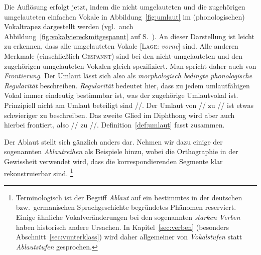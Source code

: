 Die Auflösung erfolgt jetzt, indem die nicht umgelauteten und die zugehörigen umgelauteten einfachen Vokale in Abbildung~\ref{fig:umlaut} im (phonologischen) Vokaltrapez dargestellt werden (vgl.\ auch Abbildung~\ref{fig:vokalviereckmitgespannt} auf S.~\pageref{fig:vokalviereckmitgespannt}).
An dieser Darstellung ist leicht zu erkennen, dass alle umgelauteten Vokale [\textsc{Lage}: \textit{vorne}] sind.
Alle anderen Merkmale (einschließlich \textsc{Gespannt}) sind bei den nicht-umge\-laute\-ten und den zugehörigen umgelauteten Vokalen gleich spezifiziert.
Man spricht daher auch von \textit{Frontierung}.
Der Umlaut lässt sich also als \textit{morphologisch bedingte phonologische Regularität} beschreiben.
\textit{Regularität} bedeutet hier, dass zu jedem umlautfähigen Vokal immer eindeutig bestimmbar ist, was der zugehörige Umlautvokal ist.
Prinzipiell nicht am Umlaut beteiligt sind //.
Der Umlaut von // zu // ist etwas schwieriger zu beschreiben.
Das zweite Glied im Diphthong wird aber auch hierbei frontiert, also // zu /\textipa{\oe}/.
Definition~\ref{def:umlaut} fasst zusammen.


Der Ablaut stellt sich gänzlich anders dar.
Nehmen wir dazu einige der sogenannten \textit{Ablautreihen} als Beispiele hinzu, wobei die Orthographie in der Gewissheit verwendet wird, dass die korrespondierenden Segmente klar rekonstruierbar sind.%
\footnote{Terminologisch ist der Begriff \textit{Ablaut} auf ein bestimmtes in der deutschen bzw.\ germanischen Sprachgeschichte begründetes Phänomen reserviert.
Einige ähnliche Vokalveränderungen bei den sogenannten \textit{starken Verben} haben historisch andere Ursachen.
In Kapitel~\ref{sec:verben} (besonders Abschnitt~\ref{sec:vunterklass}) wird daher allgemeiner von \textit{Vokalstufen} statt \textit{Ablautstufen} gesprochen.}

\begin{exe}
  \ex\label{ex:morph8827}
  \begin{xlist}
  \end{xlist}
\end{exe}

